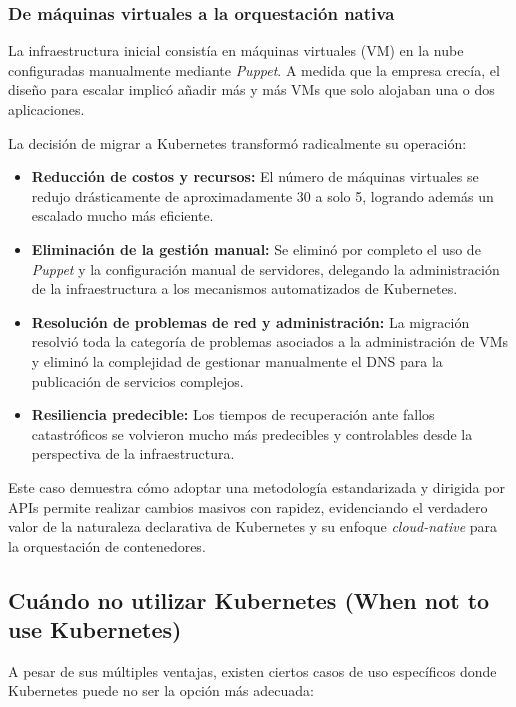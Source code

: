 \subsubsection{De máquinas virtuales a la orquestación nativa}
La infraestructura inicial consistía en máquinas virtuales (VM) en la nube configuradas manualmente mediante \textit{Puppet}. A medida que la empresa crecía, el diseño para escalar implicó añadir más y más VMs que solo alojaban una o dos aplicaciones. 

La decisión de migrar a Kubernetes transformó radicalmente su operación:
\begin{itemize}
    \item \textbf{Reducción de costos y recursos:} El número de máquinas virtuales se redujo drásticamente de aproximadamente 30 a solo 5, logrando además un escalado mucho más eficiente.
    \item \textbf{Eliminación de la gestión manual:} Se eliminó por completo el uso de \textit{Puppet} y la configuración manual de servidores, delegando la administración de la infraestructura a los mecanismos automatizados de Kubernetes.
    \item \textbf{Resolución de problemas de red y administración:} La migración resolvió toda la categoría de problemas asociados a la administración de VMs y eliminó la complejidad de gestionar manualmente el DNS para la publicación de servicios complejos.
    \item \textbf{Resiliencia predecible:} Los tiempos de recuperación ante fallos catastróficos se volvieron mucho más predecibles y controlables desde la perspectiva de la infraestructura.
\end{itemize}

Este caso demuestra cómo adoptar una metodología estandarizada y dirigida por APIs permite realizar cambios masivos con rapidez, evidenciando el verdadero valor de la naturaleza declarativa de Kubernetes y su enfoque \textit{cloud-native} para la orquestación de contenedores.

\subsection{Cuándo no utilizar Kubernetes (When not to use Kubernetes)}

A pesar de sus múltiples ventajas, existen ciertos casos de uso específicos donde Kubernetes puede no ser la opción más adecuada:

